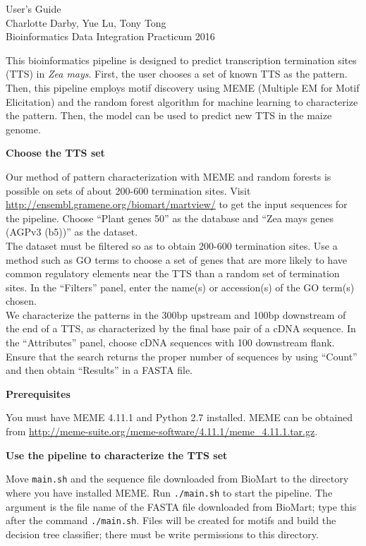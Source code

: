 \documentclass[12pt,letterpaper]{report}
\author{Charlotte Darby}
\begin{document}
\begin{center}
{\huge User's Guide}\\
Charlotte Darby, Yue Lu, Tony Tong\\
Bioinformatics Data Integration Practicum 2016\\
\end{center}

This bioinformatics pipeline is designed to predict transcription termination sites (TTS) in \textsl{Zea mays}. First, the user chooses a set of known TTS as the pattern. Then, this pipeline employs motif discovery using MEME (Multiple EM for Motif Elicitation) and the random forest algorithm for machine learning to characterize the pattern. Then, the model can be used to predict new TTS in the maize genome.


\begin{center}
\textbf{{\large Choose the TTS set}}\\
\end{center}
Our method of pattern characterization with MEME and random forests is possible on sets of about 200-600 termination sites. Visit \url{http://ensembl.gramene.org/biomart/martview/} to get the input sequences for the pipeline. Choose ``Plant genes 50'' as the database and ``Zea mays genes (AGPv3 (b5))'' as the dataset.\\
\indent The dataset must be filtered so as to obtain 200-600 termination sites. Use a method such as GO terms to choose a set of genes that are more likely to have common regulatory elements near the TTS than a random set of termination sites. In the ``Filters'' panel, enter the name(s) or accession(s) of the GO term(s) chosen.\\
\indent We characterize the patterns in the 300bp upstream and 100bp downstream of the end of a TTS, as characterized by the final base pair of a cDNA sequence. In the ``Attributes'' panel, choose cDNA sequences with 100 downstream flank. Ensure that the search returns the proper number of sequences by using ``Count'' and then obtain ``Results'' in a FASTA file. 

\begin{center}
\textbf{{\large Prerequisites}}
\end{center}
You must have MEME 4.11.1 and Python 2.7 installed. MEME can be obtained from \url{http://meme-suite.org/meme-software/4.11.1/meme_4.11.1.tar.gz}.

\begin{center}
\textbf{{\large Use the pipeline to characterize the TTS set}}
\end{center}
Move \texttt{main.sh} and the sequence file downloaded from BioMart to the directory where you have installed MEME. Run \texttt{./main.sh} to start the pipeline. The argument is the file name of the FASTA file downloaded from BioMart; type this after the command \texttt{./main.sh}. Files will be created for motifs and build the decision tree classifier; there must be write permissions to this directory. 
\end{document}
